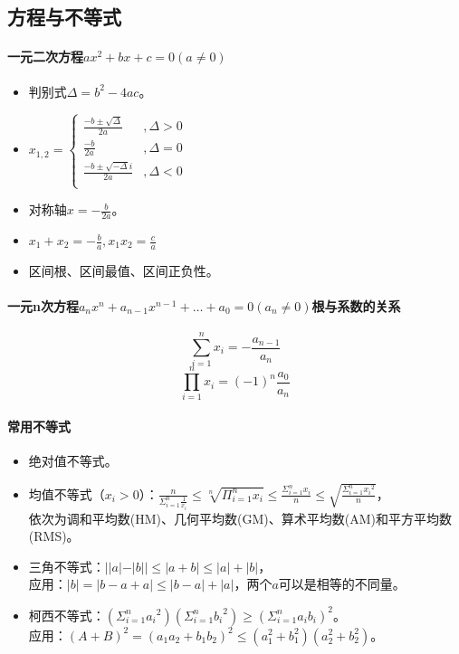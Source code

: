 \documentclass[
12pt, %
a4paper, 
oneside, %
headinclude,footinclude, %
]{scrartcl}
\begin{document}
\subsection[方程与不等式]{方程与不等式}
\paragraph{一元二次方程$ ax^2 + bx + c = 0(a \neq 0) $}
\begin{itemize}
\item 判别式$ \varDelta = b^2 - 4ac $。
\item 
$
x_{1,2}=
\begin{cases}
\frac{-b \pm \sqrt{\varDelta}}{2a} &, \varDelta > 0 \\
\frac{-b}{2a} &, \varDelta = 0 \\
\frac{-b \pm \sqrt{-\varDelta}i}{2a} &, \varDelta < 0 \\
\end{cases}
$
\item 对称轴$ x = -\frac{b}{2a} $。
\item $ x_1 + x_2 = -\frac{b}{a}, x_1 x_2 = \frac{c}{a} $
\item 区间根、区间最值、区间正负性。
\end{itemize}
\paragraph{一元n次方程$ a_n x^n + a_{n - 1} x^{n - 1} + \dots + a_0 = 0 (a_n \neq 0) $根与系数的关系}
$$ \sum_{i = 1}^{n}x_i = -\frac{a_{n - 1}}{a_n} $$
$$ \prod_{i = 1}^{n}x_i = (-1)^n \frac{a_0}{a_n} $$ 
\paragraph{常用不等式}
\begin{itemize}
\item 绝对值不等式。
\item 均值不等式（$ x_i > 0 $）：$ \frac{n}{\Sigma_{i = 1}^n \frac{1}{x_i}} \leq \sqrt[n]{\Pi_{i = 1}^n x_i} \leq \frac{\Sigma_{i = 1}^n x_i}{n} \leq \sqrt{\frac{\Sigma_{i = 1}^n {x_i}^2}{n}} $， \\
依次为调和平均数(HM)、几何平均数(GM)、算术平均数(AM)和平方平均数(RMS)。
\item 三角不等式：$ ||a|-|b|| \leq |a + b| \leq |a| + |b|$， \\
应用：$ |b| = |b - a + a| \leq |b - a| + |a| $，两个$ a $可以是相等的不同量。
\item 柯西不等式：$ (\Sigma_{i = 1}^n {a_i}^2)(\Sigma_{i = 1}^n {b_i}^2) \geq (\Sigma_{i=1}^n {a_i}{b_i})^2 $。 \\
应用：$ (A + B)^2 = (a_1 a_2 + b_1 b_2)^2 \leq (a_1^2 + b_1^2)(a_2^2 + b_2^2) $。
\end{itemize}
\end{document}
